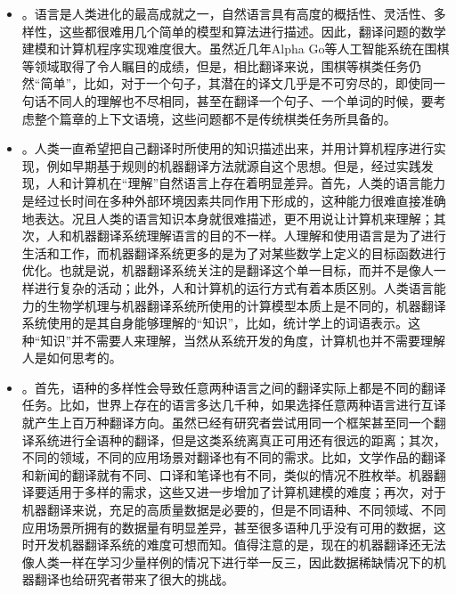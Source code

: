 \begin{itemize}
\vspace{0.5em}
\item {\small{}}。语言是人类进化的最高成就之一，自然语言具有高度的概括性、灵活性、多样性，这些都很难用几个简单的模型和算法进行描述。因此，翻译问题的数学建模和计算机程序实现难度很大。虽然近几年Alpha Go等人工智能系统在围棋等领域取得了令人瞩目的成绩，但是，相比翻译来说，围棋等棋类任务仍然``简单''，比如，对于一个句子，其潜在的译文几乎是不可穷尽的，即使同一句话不同人的理解也不尽相同，甚至在翻译一个句子、一个单词的时候，要考虑整个篇章的上下文语境，这些问题都不是传统棋类任务所具备的。
\vspace{0.5em}
\item {\small{}}。人类一直希望把自己翻译时所使用的知识描述出来，并用计算机程序进行实现，例如早期基于规则的机器翻译方法就源自这个思想。但是，经过实践发现，人和计算机在``理解''自然语言上存在着明显差异。首先，人类的语言能力是经过长时间在多种外部环境因素共同作用下形成的，这种能力很难直接准确地表达。况且人类的语言知识本身就很难描述，更不用说让计算机来理解；其次，人和机器翻译系统理解语言的目的不一样。人理解和使用语言是为了进行生活和工作，而机器翻译系统更多的是为了对某些数学上定义的目标函数进行优化。也就是说，机器翻译系统关注的是翻译这个单一目标，而并不是像人一样进行复杂的活动；此外，人和计算机的运行方式有着本质区别。人类语言能力的生物学机理与机器翻译系统所使用的计算模型本质上是不同的，机器翻译系统使用的是其自身能够理解的``知识''，比如，统计学上的词语表示。这种``知识''并不需要人来理解，当然从系统开发的角度，计算机也并不需要理解人是如何思考的。
\vspace{0.5em}
\item {\small{}}。首先，语种的多样性会导致任意两种语言之间的翻译实际上都是不同的翻译任务。比如，世界上存在的语言多达几千种，如果选择任意两种语言进行互译就产生上百万种翻译方向。虽然已经有研究者尝试用同一个框架甚至同一个翻译系统进行全语种的翻译，但是这类系统离真正可用还有很远的距离；其次，不同的领域，不同的应用场景对翻译也有不同的需求。比如，文学作品的翻译和新闻的翻译就有不同、口译和笔译也有不同，类似的情况不胜枚举。机器翻译要适用于多样的需求，这些又进一步增加了计算机建模的难度；再次，对于机器翻译来说，充足的高质量数据是必要的，但是不同语种、不同领域、不同应用场景所拥有的数据量有明显差异，甚至很多语种几乎没有可用的数据，这时开发机器翻译系统的难度可想而知。值得注意的是，现在的机器翻译还无法像人类一样在学习少量样例的情况下进行举一反三，因此数据稀缺情况下的机器翻译也给研究者带来了很大的挑战。
\vspace{0.5em}
\end{itemize}


